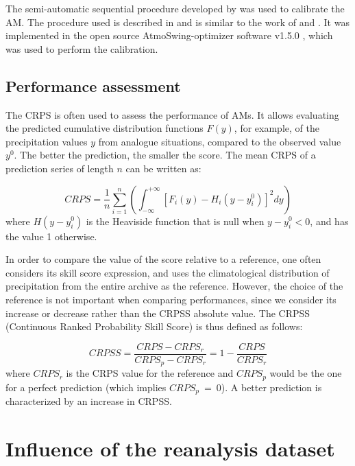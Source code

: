 \documentclass{ametsoc}
\begin{document}
The semi-automatic sequential procedure developed by \citet{Bontron2004} was used to calibrate the AM. The procedure used is described in \citet{Horton2017c} and is similar to the work of \citet{Radanovics2013} and \citet{BenDaoud2016}. It was implemented in the open source AtmoSwing-optimizer software v1.5.0 \citep[www.atmoswing.org,][]{Horton2017a}, which was used to perform the calibration.


\subsection{Performance assessment}

The CRPS \citep[Continuous Ranked Probability Score,][]{Brown1974, Matheson1976, Hersbach2000} is often used to assess the performance of AMs. It allows evaluating the predicted cumulative distribution functions $F(y)$, for example, of the precipitation values $y$ from analogue situations, compared to the observed value $y^{0}$. The better the prediction, the smaller the score. The mean CRPS of a prediction series of length $n$ can be written as:

\begin{equation}
\label{eq:CRPS}
CRPS = \frac{1}{n} \sum_{i=1}^{n} \left(  \int_{-\infty}^{+\infty} \left[ F_{i}(y)-H_{i}(y-y_{i}^{0})\right]^{2} dy \right) 
\end{equation}
where $H(y-y_{i}^{0})$ is the Heaviside function that is null when $y-y_{i}^{0}<0$, and has the value 1 otherwise.

In order to compare the value of the score relative to a reference, one often considers its skill score expression, and uses the climatological distribution of precipitation from the entire archive as the reference. However, the choice of the reference is not important when comparing performances, since we consider its increase or decrease rather than the CRPSS absolute value. The CRPSS (Continuous Ranked Probability Skill Score) is thus defined as follows:

\begin{equation}
\label{eq:CRPSS}
CRPSS = \frac{CRPS-CRPS_{r}}{CRPS_{p}-CRPS_{r}} = 1-\frac{CRPS}{CRPS_{r}}
\end{equation}
where $CRPS_{r}$ is the CRPS value for the reference and $CRPS_{p}$ would be the one for a perfect prediction (which implies $CRPS_{p}~=~0$). A better prediction is characterized by an increase in CRPSS.



\section{Influence of the reanalysis dataset}
\end{document}
